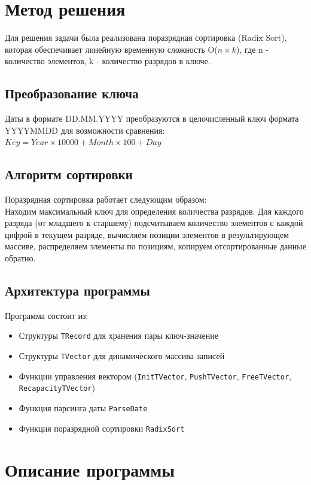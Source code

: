 \documentclass[12pt, a4paper]{article}
\begin{document}
\section{Метод решения}

Для решения задачи была реализована поразрядная сортировка (Radix Sort), которая обеспечивает линейную временную сложность O($n \times k$), где n - количество элементов, k - количество разрядов в ключе.

\subsection{Преобразование ключа}
Даты в формате DD.MM.YYYY преобразуются в целочисленный ключ формата YYYYMMDD для возможности сравнения:
$Key = Year \times 10000 + Month \times 100 + Day$

\subsection{Алгоритм сортировки}
Поразрядная сортировка работает следующим образом:\\
Находим максимальный ключ для определения количества разрядов. Для каждого разряда (от младшего к старшему) подсчитываем количество элементов с каждой цифрой в текущем разряде, вычисляем позиции элементов в результирующем массиве, распределяем элементы по позициям, копируем отсортированные данные обратно.

\subsection{Архитектура программы}
Программа состоит из:
\begin{itemize}
    \item Структуры \texttt{TRecord} для хранения пары ключ-значение
    \item Структуры \texttt{TVector} для динамического массива записей
    \item Функции управления вектором (\texttt{InitTVector}, \texttt{PushTVector}, \texttt{FreeTVector}, \texttt{RecapacityTVector})
    \item Функция парсинга даты \texttt{ParseDate}
    \item Функция поразрядной сортировки \texttt{RadixSort}
\end{itemize}

\section{Описание программы}
\end{document}

